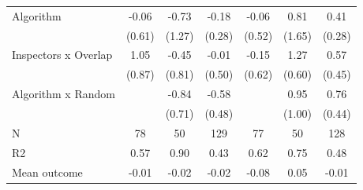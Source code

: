 \begin{tabular}{lccc|ccc}
Algorithm   &       -0.06         &       -0.73         &       -0.18         &       -0.06         &        0.81         &        0.41         \\
            &      (0.61)         &      (1.27)         &      (0.28)         &      (0.52)         &      (1.65)         &      (0.28)         \\
\addlinespace
Inspectors x Overlap&        1.05         &       -0.45         &       -0.01         &       -0.15         &        1.27\sym{*}  &        0.57         \\
            &      (0.87)         &      (0.81)         &      (0.50)         &      (0.62)         &      (0.60)         &      (0.45)         \\
\addlinespace
Algorithm x Random&                     &       -0.84         &       -0.58         &                     &        0.95         &        0.76\sym{*}  \\
            &                     &      (0.71)         &      (0.48)         &                     &      (1.00)         &      (0.44)         \\
\midrule
N           &          78         &          50         &         129         &          77         &          50         &         128         \\
R2          &        0.57         &        0.90         &        0.43         &        0.62         &        0.75         &        0.48         \\
Mean outcome&       -0.01         &       -0.02         &       -0.02         &       -0.08         &        0.05         &       -0.01         \\
\bottomrule \end{tabular}
